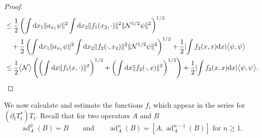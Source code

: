 \documentclass[11pt,a4paper,draft,DIV11]{scrartcl}	%
\newcommand{\ad}{\operatorname{ad}}	%
\newcommand{\di}{\textrm{d}}		%
\newcommand{\Ncal}{\mathcal{N}}		%
\newcommand{\scal}[2]{\big<#1,#2\big>} %
\newcommand{\norm}[1]{\lVert#1\rVert}	%
\newcommand{\ev}[1]{\big<#1\big>}	%
\begin{document}
\begin{proof}
\begin{align*}
& \leq \frac{1}{2} \left( \int \di x_1 \norm{a_{x_1}\psi}^2 \int \di x_2 \norm{f_1(x_2,\cdot)}^2 \norm{\Ncal^{1/2}\psi}^2 \right)^{1/2}\\
& \quad + \frac{1}{2} \left( \int \di x_1 \norm{a_{x_1}\psi}^2 \int \di x_2 \norm{f_2(\cdot,x_2)}^2 \norm{\Ncal^{1/2}\psi}^2 \right)^{1/2} + \frac{1}{2}\lvert \int f_2(x,x) \di x\rvert \scal{\psi}{\psi} \\
& \leq \frac{1}{2}\ev{\Ncal} \left(\left(\int \di x \norm{f_1(x,\cdot)}^2 \right)^{1/2} + \left(\int \di x \norm{f_2(\cdot,x)}^2 \right)^{1/2} \right) + \frac{1}{2}\lvert \int f_2(x,x) \di x\rvert \scal{\psi}{\psi}. 	\qedhere
 \end{align*}
\end{proof}

We now calculate and estimate the functions $f_i$ which appear in the series for $(\partial_t T^*_t)T_t$. Recall that for two operators $A$ and $B$
\[
 \ad^0_A(B) = B \qquad \mbox{and} \qquad \ad^n_A(B) = [A,\ad^{n-1}_A(B)] \mbox{ for } n \geq 1.
\]
\end{document}
